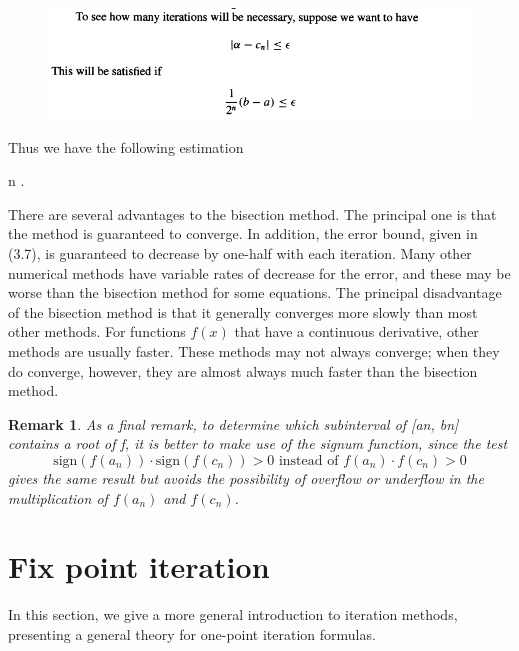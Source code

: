\documentclass[12pt]{article}
\theoremstyle{theorem}
\newtheorem{rem}{Remark}
\begin{document}
\pagebreak 

\begin{figure}[h!]
	\centering
	\includegraphics[scale=0.8]{Figures/screenshot003}
	\label{fig:screenshot002}
\end{figure}

Thus we have the following estimation 
%
\begin{shaded}
\be\label{error bound}
 n \geq {} \quad .
\ee 
\end{shaded}
%
There are several advantages to the bisection method. The principal one is that the method is guaranteed to converge. In addition, the error bound, given in (3.7), is guaranteed to decrease by one-half with each iteration. Many other numerical methods have variable rates of decrease for the error, and these may be worse than the bisection method for some equations. The principal disadvantage of the bisection method is that it generally converges more slowly than most other methods. For functions $f(x)$ that have a continuous derivative, other methods are usually faster. These methods may not always converge; when they do converge, however, they are almost always much faster than the bisection method. 

\begin{rem}
As a final remark, to determine which subinterval of [an, bn] contains a root of f, it is better to make use of the signum function, since 
the test
%
\[ \mathrm{sign} (f(a_n)) \cdot \mathrm{sign}(f(c_n)) > 0 \mbox{ instead of } f(a_n) \cdot f(c_n) > 0 \]
%
gives the same result but avoids the possibility of overflow or underflow in the multiplication of $f(a_n)$ and $f(c_n)$.
\end{rem}

\pagebreak 

\section{Fix point iteration}
In this section, we give a more general introduction to iteration methods, presenting a general theory for one-point iteration formulas. 
\end{document}
